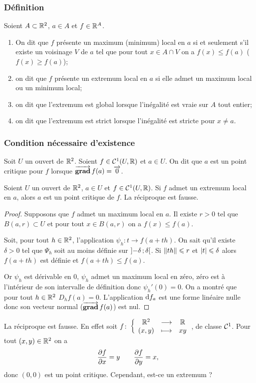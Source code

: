 \subsubsection{Définition}

\begin{defdef}
  Soient $A \subset \mathbb{R}^2$, $a \in A$ et $f \in \mathbb{R}^A$.
  \begin{enumerate}
  \item On dit que $f$ présente un maximum (minimum) local en $a$ si et seulement s'il existe un voisinage $V$ de $a$ tel que pour tout $x \in A \cap V$ on a $f(x) \leqslant f(a)$ ($f(x) \geqslant f(a)$);
  \item on dit que $f$ présente un extremum local en $a$ si elle admet un maximum local ou un minimum local;
  \item on dit que l'extremum est global lorsque l'inégalité est vraie sur $A$ tout entier;
  \item on dit que l'extremum est strict lorsque l'inégalité est stricte pour $x \neq a$.
  \end{enumerate}
\end{defdef}

\subsubsection{Condition nécessaire d'existence}

\begin{defdef}
  Soit $U$ un ouvert de $\mathbb{R}^2$. Soient $f \in \mathcal{C}^{1}(U, \mathbb{R})$ et $a \in U$. On dit que $a$ est un point critique pour $f$ lorsque $\operatorname{\overrightarrow{\mathbf{grad}}} f(a)=\overrightarrow{0}$.
\end{defdef}

\begin{theo}
  Soient $U$ un ouvert de $\mathbb{R}^2$, $a \in U$ et $f \in \mathcal{C}^{1}(U, \mathbb{R})$. Si $f$ admet un extremum local en $a$, alors $a$ est un point critique de $f$. La réciproque est fausse.
\end{theo}
\begin{proof}
  Supposons que $f$ admet un maximum local en $a$. Il existe $r>0$ tel que $B(a, r) \subset U$ et pour tout $x \in B(a, r)$ on a $f(x)\leqslant f(a)$. 

  Soit, pour tout $h\in \mathbb{R}^2$, l'application $\psi_h: t \rightarrow f(a+th)$. On sait qu'il existe $\delta>0$ tel que $\Psi_h$ soit au moins définie sur $\left] -\delta \, ;  \delta \right[$. Si $\left\lVert th\right\rVert\leqslant r$ et $\left\lvert t\right\rvert\leqslant \delta$ alors $f(a+th)$ est définie et $f(a+th) \leqslant f(a)$. 

Or $\psi_h$ est dérivable en $0$, $\psi_h$ admet un maximum local en zéro, zéro est à l'intérieur de son intervalle de définition donc $\psi_h'(0)=0$. On a montré que pour tout $h \in \mathbb{R}^2$ $D_h f(a)=0$. L'application $\mathrm{d} f_a$ est une forme linéaire nulle donc son vecteur normal ($\operatorname{\overrightarrow{\mathbf{grad}}} f(a)$) est nul.
\end{proof}
%
La réciproque est fausse. En effet soit $f\colon \left\{\begin{array}{ccc} \mathbb{R}^2 & \longrightarrow &\mathbb{R}\\ (x,y) & \longmapsto & xy \end{array} \right.$, de classe $\mathcal{C}^{1}$. Pour tout $(x,y) \in \mathbb{R}^2$ on a
\begin{equation}
  \dfrac{\partial{} f}{\partial{} x} = y \qquad \dfrac{\partial{} f}{\partial{} y} = x,
\end{equation}
donc $(0, 0)$ est un point critique. Cependant, est-ce un extremum ?

